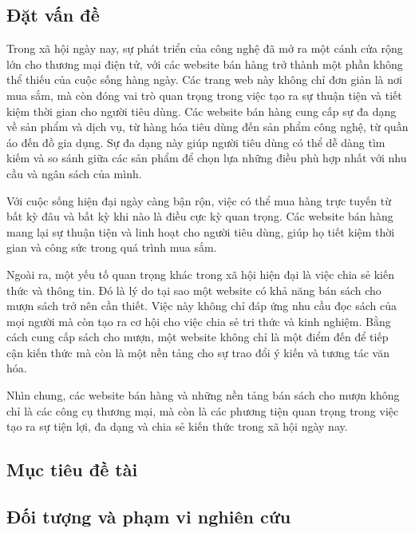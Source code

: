 {}
\setcounter{section}{1}

\subsection{Đặt vấn đề}
Trong xã hội ngày nay, sự phát triển của công nghệ đã mở ra một cánh cửa rộng lớn cho thương mại điện tử, với các website bán hàng trở thành một phần không thể thiếu của cuộc sống hàng ngày. Các trang web này không chỉ đơn giản là nơi mua sắm, mà còn đóng vai trò quan trọng trong việc tạo ra sự thuận tiện và tiết kiệm thời gian cho người tiêu dùng. Các website bán hàng cung cấp sự đa dạng về sản phẩm và dịch vụ, từ hàng hóa tiêu dùng đến sản phẩm công nghệ, từ quần áo đến đồ gia dụng. Sự đa dạng này giúp người tiêu dùng có thể dễ dàng tìm kiếm và so sánh giữa các sản phẩm để chọn lựa những điều phù hợp nhất với nhu cầu và ngân sách của mình.\par
Với cuộc sống hiện đại ngày càng bận rộn, việc có thể mua hàng trực tuyến từ bất kỳ đâu và bất kỳ khi nào là điều cực kỳ quan trọng. Các website bán hàng mang lại sự thuận tiện và linh hoạt cho người tiêu dùng, giúp họ tiết kiệm thời gian và công sức trong quá trình mua sắm.\par
Ngoài ra, một yếu tố quan trọng khác trong xã hội hiện đại là việc chia sẻ kiến thức và thông tin. Đó là lý do tại sao một website có khả năng bán sách cho mượn sách trở nên cần thiết. Việc này không chỉ đáp ứng nhu cầu đọc sách của mọi người mà còn tạo ra cơ hội cho việc chia sẻ tri thức và kinh nghiệm. Bằng cách cung cấp sách cho mượn, một website không chỉ là một điểm đến để tiếp cận kiến thức mà còn là một nền tảng cho sự trao đổi ý kiến và tương tác văn hóa.\par
Nhìn chung, các website bán hàng và những nền tảng bán sách cho mượn không chỉ là các công cụ thương mại, mà còn là các phương tiện quan trọng trong việc tạo ra sự tiện lợi, đa dạng và chia sẻ kiến thức trong xã hội ngày nay.


\subsection{Mục tiêu đề tài}

\subsection{Đối tượng và phạm vi nghiên cứu}

